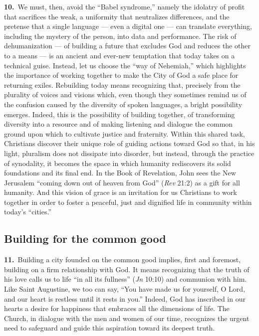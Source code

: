 \documentclass{article}
\begin{document}
\textbf{10.}\ We must, then, avoid the ``Babel syndrome,'' namely the idolatry of profit that sacrifices the weak, a uniformity that neutralizes differences, and the pretense that a single language --- even a digital one --- can translate everything, including the mystery of the person, into data and performance. The risk of dehumanization --- of building a future that excludes God and reduces the other to a means --- is an ancient and ever-new temptation that today takes on a technical guise. Instead, let us choose the ``way of Nehemiah,'' which highlights the importance of working together to make the City of God a safe place for returning exiles. Rebuilding today means recognizing that, precisely from the plurality of voices and visions which, even though they sometimes remind us of the confusion caused by the diversity of spoken languages, a bright possibility emerges. Indeed, this is the possibility of building together, of transforming diversity into a resource and of making listening and dialogue the common ground upon which to cultivate justice and fraternity. Within this shared task, Christians discover their unique role of guiding actions toward God so that, in his light, pluralism does not dissipate into disorder, but instead, through the practice of synodality, it becomes the space in which humanity rediscovers its solid foundations and its final end. In the Book of Revelation, John sees the New Jerusalem ``coming down out of heaven from God'' (\emph{Rev} 21:2) as a gift for all humanity. And this vision of grace is an invitation for us Christians to work together in order to foster a peaceful, just and dignified life in community within today's ``cities.''

\subsection{Building for the common good}

\textbf{11.}\ Building a city founded on the common good implies, first and foremost, building on a firm relationship with God. It means recognizing that the truth of his love calls us to life ``in all its fullness'' (\emph{Jn} 10:10) and communion with him. Like Saint Augustine, we too can say, ``You have made us for yourself, O Lord, and our heart is restless until it rests in you.''\cite{n8} Indeed, God has inscribed in our hearts a desire for happiness that embraces all the dimensions of life. The Church, in dialogue with the men and women of our time, recognizes the urgent need to safeguard and guide this aspiration toward its deepest truth.
\end{document}
